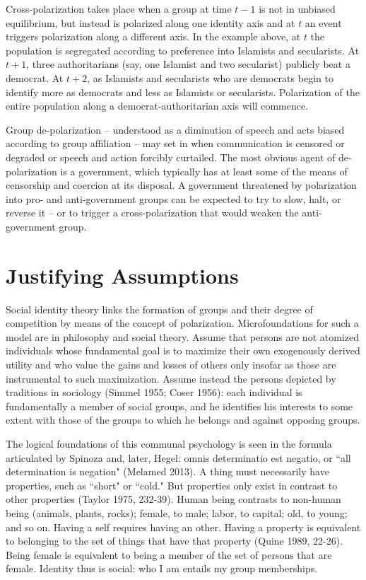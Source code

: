 \documentclass[12pt]{article}
\begin{document}
Cross-polarization takes place when a group at time $t-1$ is not in unbiased equilibrium, but instead is polarized along one identity axis and at $t$ an event triggers polarization along a different axis.  In the example above, at $t$ the population is segregated according to preference into Islamists and secularists.  At $t+1$, three authoritarians (say, one Islamist and two secularist) publicly beat a democrat.  At $t+2$, as Islamists and secularists who are democrats begin to identify more as democrats and less as Islamists or secularists.  Polarization of the entire population along a democrat-authoritarian axis will commence.

Group de-polarization – understood as a diminution of speech and acts biased according to group affiliation – may set in when communication is censored or degraded or speech and action forcibly curtailed.  The most obvious agent of de-polarization is a government, which typically has at least some of the means of censorship and coercion at its disposal.  A government threatened by polarization into pro- and anti-government groups can be expected to try to slow, halt, or reverse it – or to trigger a cross-polarization that would weaken the anti-government group.  

\section*{Justifying Assumptions}
Social identity theory links the formation of groups and their degree of competition by means of the concept of polarization.  Microfoundations for such a model are in philosophy and social theory.  Assume that persons are not atomized individuals whose fundamental goal is to maximize their own exogenously derived utility and who value the gains and losses of others only insofar as those are instrumental to such maximization.  Assume instead the persons depicted by traditions in sociology (Simmel 1955; Coser 1956):  each individual is fundamentally a member of social groups, and he identifies his interests to some extent with those of the groups to which he belongs and against opposing groups.

The logical foundations of this communal psychology is seen in the formula articulated by Spinoza and, later, Hegel:  omnis determinatio est negatio, or ``all determination is negation" (Melamed 2013).  A thing must necessarily have properties, such as ``short" or ``cold."  But properties only exist in contrast to other properties (Taylor 1975, 232-39).  Human being contrasts to non-human being (animals, plants, rocks); female, to male; labor, to capital; old, to young; and so on.  Having a self requires having an other.   Having a property is equivalent to belonging to the set of things that have that property (Quine 1989, 22-26).  Being female is equivalent to being a member of the set of persons that are female.  Identity thus is social:  who I am entails my group memberships.
\end{document}
